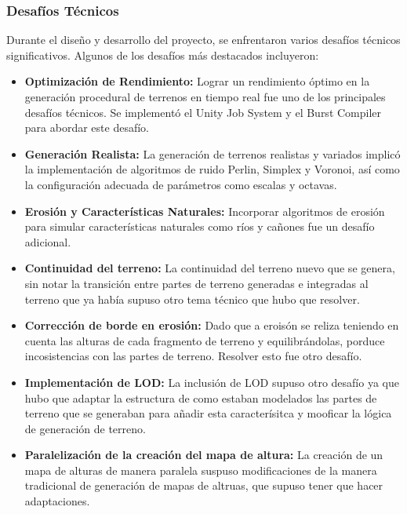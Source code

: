\subsubsection{Desafíos Técnicos}
Durante el diseño y desarrollo del proyecto, se enfrentaron varios desafíos técnicos significativos. Algunos de los desafíos más destacados incluyeron:

\begin{itemize}
    \item \textbf{Optimización de Rendimiento:} Lograr un rendimiento óptimo en la generación procedural de terrenos en tiempo real fue uno de los principales desafíos técnicos. Se implementó el Unity Job System y el Burst Compiler para abordar este desafío.
    
    \item \textbf{Generación Realista:} La generación de terrenos realistas y variados implicó la implementación de algoritmos de ruido Perlin, Simplex y Voronoi, así como la configuración adecuada de parámetros como escalas y octavas.
    
    \item \textbf{Erosión y Características Naturales:} Incorporar algoritmos de erosión para simular características naturales como ríos y cañones fue un desafío adicional.
    
    \item \textbf{Continuidad del terreno:} La continuidad del terreno nuevo que se genera, sin notar la transición entre partes de terreno generadas e integradas al terreno que ya había supuso otro tema técnico que hubo que resolver.
    
    \item \textbf{Corrección de borde en erosión:} Dado que a eroisón se reliza teniendo en cuenta las alturas de cada fragmento de terreno y equilibrándolas, porduce incosistencias con las partes de terreno. Resolver esto fue otro desafío.
    
    \item \textbf{Implementación de LOD:}  La inclusión de LOD supuso otro desafío ya que hubo que adaptar la estructura de como estaban modelados las partes de terreno que se generaban para añadir esta caracterísitca y mooficar la lógica de generación de terreno.
    
    \item \textbf{Paralelización de la creación del mapa de altura:} La creación de un mapa de alturas de manera paralela suspuso modificaciones de la manera tradicional de generación de mapas de altruas, que supuso tener que hacer adaptaciones.
     

\end{itemize}
